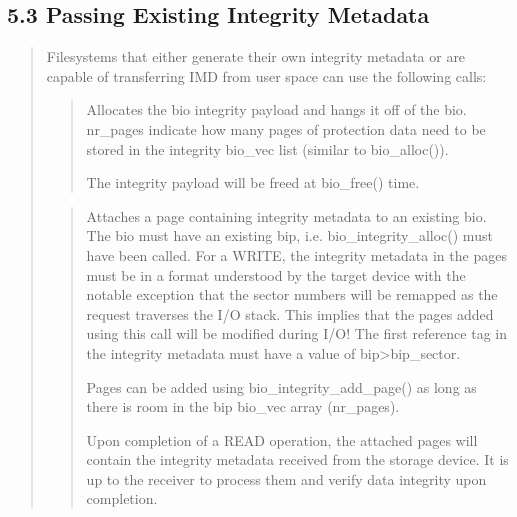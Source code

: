 \documentclass[a4paper,11pt,english]{sphinxmanual}
\begin{document}
\subsection{5.3 Passing Existing Integrity Metadata}
\label{\detokenize{data-integrity:passing-existing-integrity-metadata}}\begin{quote}

Filesystems that either generate their own integrity metadata or
are capable of transferring IMD from user space can use the
following calls:

\begin{quote}

Allocates the bio integrity payload and hangs it off of the bio.
nr\_pages indicate how many pages of protection data need to be
stored in the integrity bio\_vec list (similar to bio\_alloc()).

The integrity payload will be freed at bio\_free() time.
\end{quote}

\begin{quote}

Attaches a page containing integrity metadata to an existing
bio.  The bio must have an existing bip,
i.e. bio\_integrity\_alloc() must have been called.  For a WRITE,
the integrity metadata in the pages must be in a format
understood by the target device with the notable exception that
the sector numbers will be remapped as the request traverses the
I/O stack.  This implies that the pages added using this call
will be modified during I/O!  The first reference tag in the
integrity metadata must have a value of bip\sphinxhyphen{}\textgreater{}bip\_sector.

Pages can be added using bio\_integrity\_add\_page() as long as
there is room in the bip bio\_vec array (nr\_pages).

Upon completion of a READ operation, the attached pages will
contain the integrity metadata received from the storage device.
It is up to the receiver to process them and verify data
integrity upon completion.
\end{quote}
\end{quote}
\end{document}
